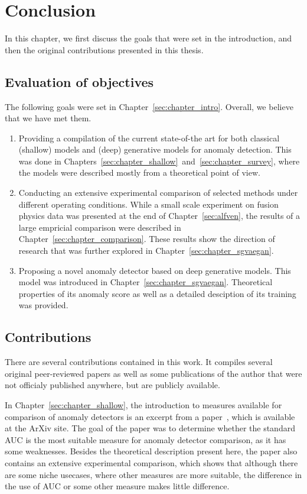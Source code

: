 \chapter{Conclusion} \label{sec:conclusion}
In this chapter, we first discuss the goals that were set in the introduction, and then the original contributions presented in this thesis.

\section{Evaluation of objectives}
The following goals were set in Chapter~\ref{sec:chapter_intro}. Overall, we believe that we have met them.

\begin{enumerate}
	\item Providing a compilation of the current state-of-the art for both classical (shallow) models and (deep) generative models for anomaly detection. This was done in Chapters~\ref{sec:chapter_shallow}~and~\ref{sec:chapter_survey}, where the models were described mostly from a theoretical point of view. 
	\item Conducting an extensive experimental comparison of selected methods under different operating conditions. While a small scale experiment on fusion physics data was presented at the end of Chapter~\ref{sec:alfven}, the results of a large empricial comparison were described in Chapter~\ref{sec:chapter_comparison}. These results show the direction of research that was further explored in Chapter~\ref{sec:chapter_sgvaegan}.
	\item Proposing a novel anomaly detector based on deep generative models. This model was introduced in Chapter~\ref{sec:chapter_sgvaegan}. Theoretical properties of its anomaly score as well as a detailed desciption of its training was provided.
\end{enumerate}


\section{Contributions}
There are several contributions contained in this work. It compiles several original peer-reviewed papers as well as some publications of the author that were not officialy published anywhere, but are publicly available.

In Chapter~\ref{sec:chapter_shallow}, the introduction to measures available for comparison of anomaly detectors is an excerpt from a paper~\cite{vskvara2023auc}, which is available at the ArXiv site. The goal of the paper was to determine whether the standard AUC is the most suitable measure for anomaly detector comparison, as it has some weaknesses. Besides the theoretical description present here, the paper also contains an extensive experimental comparison, which shows that although there are some niche usecases, where other measures are more suitable, the difference in the use of AUC or some other measure makes little difference. 

